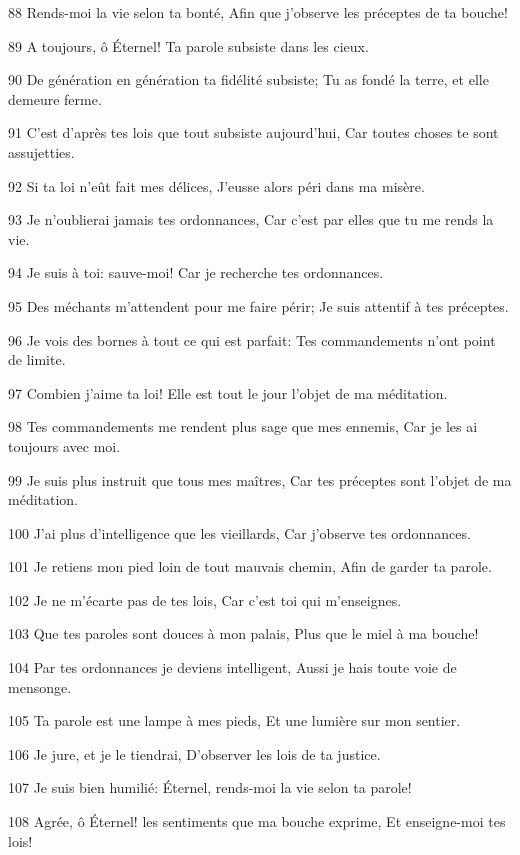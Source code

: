 \par 88 Rends-moi la vie selon ta bonté, Afin que j'observe les préceptes de ta bouche!
\par 89 A toujours, ô Éternel! Ta parole subsiste dans les cieux.
\par 90 De génération en génération ta fidélité subsiste; Tu as fondé la terre, et elle demeure ferme.
\par 91 C'est d'après tes lois que tout subsiste aujourd'hui, Car toutes choses te sont assujetties.
\par 92 Si ta loi n'eût fait mes délices, J'eusse alors péri dans ma misère.
\par 93 Je n'oublierai jamais tes ordonnances, Car c'est par elles que tu me rends la vie.
\par 94 Je suis à toi: sauve-moi! Car je recherche tes ordonnances.
\par 95 Des méchants m'attendent pour me faire périr; Je suis attentif à tes préceptes.
\par 96 Je vois des bornes à tout ce qui est parfait: Tes commandements n'ont point de limite.
\par 97 Combien j'aime ta loi! Elle est tout le jour l'objet de ma méditation.
\par 98 Tes commandements me rendent plus sage que mes ennemis, Car je les ai toujours avec moi.
\par 99 Je suis plus instruit que tous mes maîtres, Car tes préceptes sont l'objet de ma méditation.
\par 100 J'ai plus d'intelligence que les vieillards, Car j'observe tes ordonnances.
\par 101 Je retiens mon pied loin de tout mauvais chemin, Afin de garder ta parole.
\par 102 Je ne m'écarte pas de tes lois, Car c'est toi qui m'enseignes.
\par 103 Que tes paroles sont douces à mon palais, Plus que le miel à ma bouche!
\par 104 Par tes ordonnances je deviens intelligent, Aussi je hais toute voie de mensonge.
\par 105 Ta parole est une lampe à mes pieds, Et une lumière sur mon sentier.
\par 106 Je jure, et je le tiendrai, D'observer les lois de ta justice.
\par 107 Je suis bien humilié: Éternel, rends-moi la vie selon ta parole!
\par 108 Agrée, ô Éternel! les sentiments que ma bouche exprime, Et enseigne-moi tes lois!
